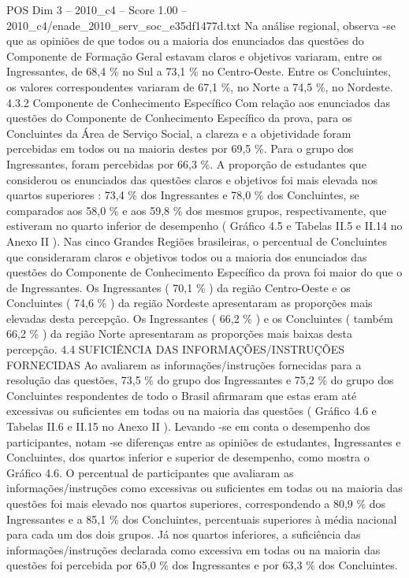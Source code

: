 \begin{textsample}{POS Dim 3 – 2010\_c4 – Score 1.00 – 2010\_c4/enade\_2010\_serv\_soc\_e35df1477d.txt}
Na análise regional, observa -se que as opiniões de que todos ou a maioria dos enunciados das questões do Componente de Formação Geral estavam claros e objetivos variaram, entre os Ingressantes, de 68,4 \% no Sul a 73,1 \% no Centro-Oeste.
Entre os Concluintes, os valores correspondentes variaram de 67,1 \%, no Norte a 74,5 \%, no Nordeste. 4.3.2 Componente de Conhecimento Específico Com relação aos enunciados das questões do Componente de Conhecimento Específico da prova, para os Concluintes da Área de Serviço Social, a clareza e a objetividade foram percebidas em todos ou na maioria destes por 69,5 \%.
Para o grupo dos Ingressantes, foram percebidas por 66,3 \%.
A proporção de estudantes que considerou os enunciados das questões claros e objetivos foi mais elevada nos quartos superiores : 73,4 \% dos Ingressantes e 78,0 \% dos Concluintes, se comparados aos 58,0 \% e aos 59,8 \% dos mesmos grupos, respectivamente, que estiveram no quarto inferior de desempenho ( Gráfico 4.5 e Tabelas II.5 e II.14 no Anexo II ).
Nas cinco Grandes Regiões brasileiras, o percentual de Concluintes que consideraram claros e objetivos todos ou a maioria dos enunciados das questões do Componente de Conhecimento Específico da prova foi maior do que o de Ingressantes.
Os Ingressantes ( 70,1 \% ) da região Centro-Oeste e os Concluintes ( 74,6 \% ) da região Nordeste apresentaram as proporções mais elevadas desta percepção.
Os Ingressantes ( 66,2 \% ) e os Concluintes ( também 66,2 \% ) da região Norte apresentaram as proporções mais baixas desta percepção. 4.4 SUFICIÊNCIA DAS INFORMAÇÕES/INSTRUÇÕES FORNECIDAS Ao avaliarem as informações/instruções fornecidas para a resolução das questões, 73,5 \% do grupo dos Ingressantes e 75,2 \% do grupo dos Concluintes respondentes de todo o Brasil afirmaram que estas eram até excessivas ou suficientes em todas ou na maioria das questões ( Gráfico 4.6 e Tabelas II.6 e II.15 no Anexo II ).
Levando -se em conta o desempenho dos participantes, notam -se diferenças entre as opiniões de estudantes, Ingressantes e Concluintes, dos quartos inferior e superior de desempenho, como mostra o Gráfico 4.6.
O percentual de participantes que avaliaram as informações/instruções como excessivas ou suficientes em todas ou na maioria das questões foi mais elevado nos quartos superiores, correspondendo a 80,9 \% dos Ingressantes e a 85,1 \% dos Concluintes, percentuais superiores à média nacional para cada um dos dois grupos.
Já nos quartos inferiores, a suficiência das informações/instruções declarada como excessiva em todas ou na maioria das questões foi percebida por 65,0 \% dos Ingressantes e por 63,3 \% dos Concluintes.

\end{textsample}
